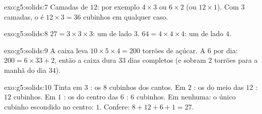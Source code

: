 \begin{solution}{exo:g5:solids:7}
Camadas de $12$: por exemplo $4 \times 3$ ou $6 \times 2$ (ou
$12 \times 1$). Com $3$ camadas, o  é $12 \times 3 = 36$
cubinhos em qualquer caso.
\end{solution}

\begin{solution}{exo:g5:solids:8}
$27 = 3 \times 3 \times 3$: um  de lado $3$.
$64 = 4 \times 4 \times 4$: um  de lado $4$.
\end{solution}

\begin{solution}{exo:g5:solids:9}
A caixa leva $10 \times 5 \times 4 = 200$ torrões de açúcar. A $6$
por dia: $200 = 6 \times 33 + 2$, então a caixa dura $33$ dias
completos (e sobram $2$ torrões para a manhã do dia $34$).
\end{solution}

\begin{solution}{exo:g5:solids:10}
Tinta em $3$ : os $8$ cubinhos dos cantos. Em $2$ : os do
meio das $12$ : $12$ cubinhos. Em $1$ : os do centro das
$6$ : $6$ cubinhos. Em nenhuma: o único cubinho escondido no
centro: $1$. Confere: $8 + 12 + 6 + 1 = 27$. \checkmark
\end{solution}
